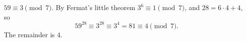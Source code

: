\(59\equiv3\pmod7\). By Fermat's little theorem \(3^6\equiv1\pmod 7\), and \(28=6\cdot4+4\), so
\[
59^{28}\equiv3^{28}\equiv3^4=81\equiv4\pmod7 .
\]
The remainder is \(\boxed{4}\).
